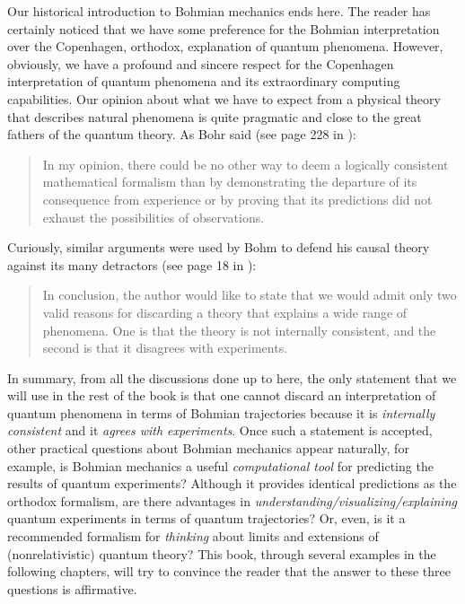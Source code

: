 \documentclass[onecolumn,nofootinbib, secnumarabic, amsmath, nobibnotes,11pt,aps,pra]{revtex4-1}
\begin{document}
Our historical introduction to Bohmian mechanics ends here. The
reader has certainly noticed that we have some preference for the
Bohmian interpretation over the Copenhagen, orthodox, explanation of
quantum phenomena. However, obviously, we have a profound and
sincere respect for the Copenhagen interpretation of quantum
phenomena and its extraordinary computing capabilities. Our opinion
about what we have to expect from a physical theory that describes
natural phenomena is quite pragmatic and close to the great fathers
of the quantum theory. As Bohr said (see page 228 in
\cite{om.bohr1949}):\\
\begin{quote}
In my opinion, there could be no other way to deem a logically consistent mathematical formalism than by demonstrating the departure of its consequence from experience or by proving that its predictions did not exhaust the possibilities of observations.\\
\end{quote}
Curiously, similar arguments were used by Bohm to defend his causal theory against its many detractors (see page 18 in \cite{om.Bohm1953b}):\\
\begin{quote}
In conclusion, the author would like to state that we would admit only two valid reasons for discarding a theory that explains a wide range of phenomena. One is that the theory is not internally consistent, and the second is that it disagrees with experiments.\\
\end{quote}\vspace*{-12pt}
In summary, from all the discussions done up to here, the only
statement that we will use in the rest of the book is that one
cannot discard an interpretation of quantum phenomena in terms of
Bohmian trajectories because it is \textit{internally consistent}
and it \textit{agrees with experiments}. Once such a statement is
accepted, other practical questions about Bohmian mechanics appear
naturally, for example, is Bohmian mechanics a useful
\textit{computational tool} for predicting the results of quantum experiments?
Although it provides identical predictions as the orthodox
formalism, are there advantages in
\textit{understanding/visualizing/explaining} quantum experiments in
terms of quantum trajectories? Or, even, is it a recommended
formalism for \textit{thinking} about limits and extensions of
(nonrelativistic) quantum theory? This book, through several
examples in the following chapters, will try to convince the reader
that the answer to these three questions is affirmative.
\end{document}
